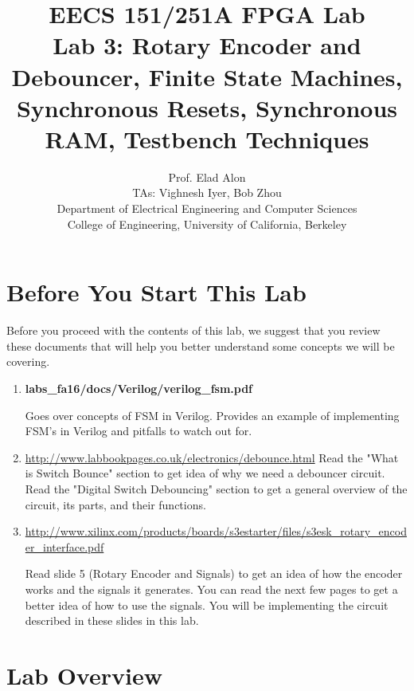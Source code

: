 \documentclass[11pt]{article}
\begin{document}
\title{EECS 151/251A FPGA Lab\\
Lab 3: Rotary Encoder and Debouncer, Finite State Machines, Synchronous Resets, Synchronous RAM, Testbench Techniques}

\author{Prof. Elad Alon \\
TAs: Vighnesh Iyer, Bob Zhou \\Department of Electrical Engineering and Computer Sciences\\
College of Engineering, University of California, Berkeley}
\date{}
\maketitle

\tableofcontents

\section{Before You Start This Lab}

Before you proceed with the contents of this lab, we suggest that you review these documents that will help you better understand some concepts we will be covering.

\begin{enumerate}
	\item \textbf{labs\_fa16/docs/Verilog/verilog\_fsm.pdf}
	
	Goes over concepts of FSM in Verilog. Provides an example of implementing FSM's in Verilog and pitfalls to watch out for.
	
	\item \url{http://www.labbookpages.co.uk/electronics/debounce.html}
	Read the "What is Switch Bounce" section to get idea of why we need a debouncer circuit. Read the "Digital Switch Debouncing" section to get a general overview of the circuit, its parts, and their functions.
	
	\item \url{http://www.xilinx.com/products/boards/s3estarter/files/s3esk_rotary_encoder_interface.pdf}
	
	Read slide 5 (Rotary Encoder and Signals) to get an idea of how the encoder works and the signals it generates. You can read the next few pages to get a better idea of how to use the signals. You will be implementing the circuit described in these slides in this lab.

\end{enumerate}

\section{Lab Overview}
\end{document}
